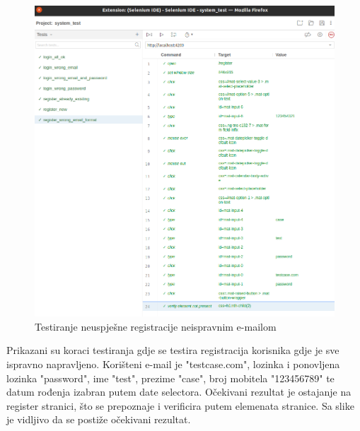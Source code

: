             \begin{figure}[H]
                \includegraphics[width=\textwidth]{slike/tests_system/register_wrong_format.png} %
                \caption{Testiranje neuspješne registracije neispravnim e-mailom}
                \label{fig:struktura} %
            \end{figure}
            Prikazani su koraci testiranja gdje se testira registracija korisnika gdje je sve ispravno napravljeno. Korišteni e-mail je "testcase.com", lozinka i ponovljena lozinka "password", ime "test", prezime "case", broj mobitela "123456789" te datum rođenja izabran putem date selectora. Očekivani rezultat je ostajanje na register stranici, što se prepoznaje i verificira putem elemenata stranice. Sa slike je vidljivo da se postiže očekivani rezultat.

